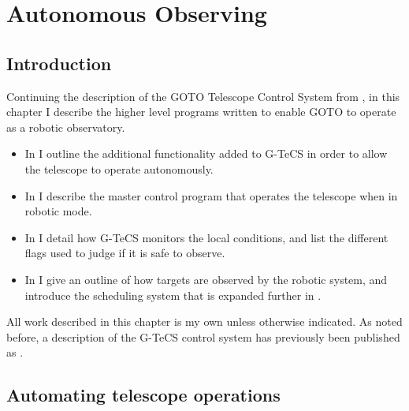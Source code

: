 
\chapter{Autonomous Observing}
\label{chap:autonomous}


\chaptoc{}


\section{Introduction}
\label{sec:autonomous_intro}


\begin{colsection}

Continuing the description of the GOTO Telescope Control System from , in this chapter I describe the higher level programs written to enable GOTO to operate as a robotic observatory.
%
\begin{itemize}
    \item In  I outline the additional functionality added to G-TeCS in order to allow the telescope to operate autonomously.
    \item In  I describe the master control program that operates the telescope when in robotic mode.
    \item In  I detail how G-TeCS monitors the local conditions, and list the different flags used to judge if it is safe to observe.
    \item In  I give an outline of how targets are observed by the robotic system, and introduce the scheduling system that is expanded further in .
\end{itemize}
%
All work described in this chapter is my own unless otherwise indicated. As noted before, a description of the G-TeCS control system has previously been published as \citet{Dyer}.

\end{colsection}


\section{Automating telescope operations}
\label{sec:auto}

